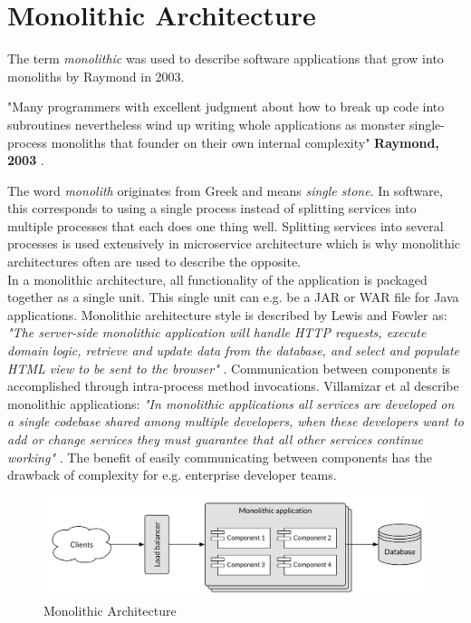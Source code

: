 \section{Monolithic Architecture}
The term \textit{monolithic} was used to describe software applications that grow into monoliths by Raymond in 2003.

\begin{citat} []
"Many programmers with excellent judgment about how to break up code into subroutines nevertheless wind up writing whole applications as monster single-process monoliths that founder on their own internal complexity" \textbf{Raymond, 2003} \cite[p. 188]{raymond2003taoup}.
\end{citat}

\noindent
The word \textit{monolith} originates from Greek and means \textit{single stone}. In software, this corresponds to using a single process instead of splitting services into multiple processes that each does one thing well. Splitting services into several processes is used extensively in microservice architecture which is why monolithic architectures often are used to describe the opposite. \\

\noindent
In a monolithic architecture, all functionality of the application is packaged together as a single unit. This single unit can e.g. be a JAR or WAR file for Java applications. Monolithic architecture style is described by Lewis and Fowler as: \textit{"The server-side monolithic application will handle HTTP requests, execute domain logic, retrieve and update data from the database, and select and populate HTML view to be sent to the browser"} \cite[p. 2]{lewis2014nutshell}. Communication between components is accomplished through intra-process method invocations. Villamizar et al describe monolithic applications: \textit{"In monolithic applications all services are developed on a single codebase shared among multiple developers, when these developers want to add or change services they must guarantee that all other services continue working"} \cite[p. 584]{villamizar2015evaluating}. The benefit of easily communicating between components has the drawback of complexity for e.g. enterprise developer teams.

\begin{figure}[H]
    \centering
    \includegraphics[width=12cm]{figures/monolithic_architecture}
    \caption{Monolithic Architecture}
    \label{fig:monolithic}
\end{figure}

